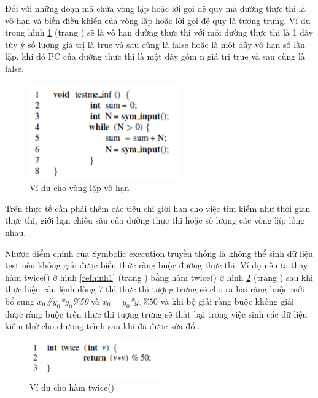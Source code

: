 \documentclass[12pt,a4paper]{article}
\begin{document}
\indent Đối với những đoạn mã chứa vòng lặp hoặc lời gọi đệ quy mà đường thực thi là vô hạn và biến điều khiển của vòng lặp hoặc lời gọi đệ quy là tượng trưng. Ví dụ trong hình \ref{refhinh3} (trang \pageref{refhinh3}) sẽ là vô hạn đường thực thi với mỗi đường thực thi là 1 dãy tùy ý số lượng giá trị là true và sau cùng là false hoặc là một dãy vô hạn số lần lặp, khi đó PC của đường thực thị là một dãy gồm n giá trị true và sau cùng là false.

\begin{figure}[ht]
\begin{center}
\includegraphics{hinhanh/hinh3}
\end{center}
\caption{Ví dụ cho vòng lặp vô hạn}
\label{refhinh3}
\end{figure}

\indent Trên thực tế cần phải thêm các tiêu chí giới hạn cho việc tìm kiếm như thời gian thực thi, giới hạn chiều sâu của đường thực thi hoặc số lượng các vòng lặp lồng nhau.

\indent Nhược điểm chính của Symbolic execution truyền thống là không thể sinh dữ liệu test nếu không giải được biểu thức ràng buộc đường thực thi. Ví dụ nếu ta thay hàm twice() ở hình \ref{refhinh1} (trang \pageref{refhinh1}) bằng hàm twice() ở hình \ref{refhinh4} (trang \pageref{refhinh4}) sau khi thực hiện câu lệnh dòng 7 thì thực thi tượng trưng sẽ cho ra hai ràng buộc mới bổ sung \textit{$x_0$\#$y_0$*$y_0$\%50} và \textit{$x_0=y_0$*$y_0$\%$50$} và khi bộ giải ràng buộc không giải được ràng buộc trên thực thi tượng trưng sẽ thất bại trong việc sinh các dữ liệu kiểm thử cho chương trình sau khi đã được sửa đổi.

\begin{figure}[ht]
\begin{center}
\includegraphics{hinhanh/hinh4}
\end{center}
\caption{Ví dụ cho hàm twice()}
\label{refhinh4}
\end{figure}
\end{document}

